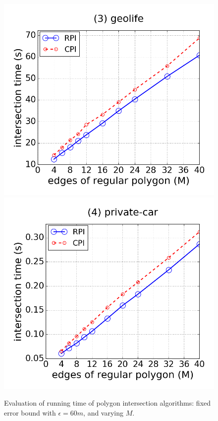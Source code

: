 \begin{figure}[tb!]
\includegraphics[scale = 0.250]{figures/Exp-M-poly-time-geolife.png}
\includegraphics[scale = 0.250]{figures/Exp-M-poly-time-private.png}
\vspace{-2ex}
\caption{\small Evaluation of running time of polygon intersection algorithms: fixed error bound with $\epsilon=60m$, and varying $M$.}
\label{fig:m-poly-time}
\vspace{-2ex}
\end{figure}

